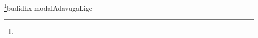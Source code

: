 \begin{artha}
\footnote{}budidhx modalAdavugaLige
\end{artha}

\begin{artha}

\end{artha}

\begin{artha}

\end{artha}

\begin{artha}

\end{artha}

\begin{artha}

\end{artha}

\begin{artha}

\end{artha}

\begin{artha}

\end{artha}

\begin{artha}

\end{artha}

\begin{artha}

\end{artha}

\begin{artha}

\end{artha}

\begin{artha}

\end{artha}

\begin{artha}

\end{artha}

\begin{artha}

\end{artha}

\begin{artha}

\end{artha}

